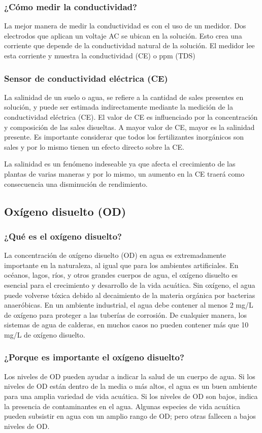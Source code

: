 \subsubsection{¿Cómo medir la conductividad?}
La mejor manera de medir la conductividad es con el uso de un medidor. 
Dos electrodos que aplican un voltaje AC se ubican en la solución. 
Esto crea una corriente que depende de la conductividad natural de la solución. 
El medidor lee esta corriente y muestra la conductividad (CE) o ppm (TDS)


\subsubsection{Sensor de conductividad eléctrica (CE) }
La salinidad de un suelo o agua, se refiere a la cantidad de sales presentes en solución, y puede ser estimada indirectamente mediante la medición de la conductividad eléctrica (CE). 
El valor de CE es influenciado por la concentración y composición de las sales disueltas. 
A mayor valor de CE, mayor es la salinidad presente. 
Es importante considerar que todos los fertilizantes inorgánicos son sales y por lo mismo tienen un efecto directo sobre la CE.

La salinidad es un fenómeno indeseable ya que afecta el crecimiento de las plantas  de varias maneras y por lo mismo, un aumento en la CE traerá como consecuencia una disminución de rendimiento.

\subsection{Oxígeno disuelto (OD)}
\subsubsection{¿Qué es el oxígeno disuelto?}
La concentración de oxígeno disuelto (OD) en agua es extremadamente importante en la naturaleza, al igual que para los ambientes artificiales.  
En océanos, lagos, ríos, y otros grandes cuerpos de agua, el oxígeno disuelto es esencial para el crecimiento y desarrollo de la vida acuática.  
Sin oxígeno, el agua puede volverse tóxica debido al decaimiento de la materia orgánica por bacterias anaeróbicas. 
En un ambiente industrial, el agua debe contener al menos 2 mg/L de oxígeno para proteger a las tuberías de corrosión.  
De cualquier manera, los sistemas de agua de calderas, en muchos casos no pueden contener más que 10 mg/L de oxígeno disuelto.

\subsubsection{¿Porque es importante el oxígeno disuelto?}
Los niveles de OD pueden ayudar a indicar la salud de un cuerpo de agua. 
Si los niveles de OD están dentro de la media o más altos, el agua es un buen ambiente para una amplia variedad de vida acuática. 
Si los niveles de OD son bajos, indica la presencia de contaminantes en el agua. 
Algunas especies de vida acuática pueden subsistir en agua con un amplio rango de OD; pero otras fallecen a bajos niveles de OD.

